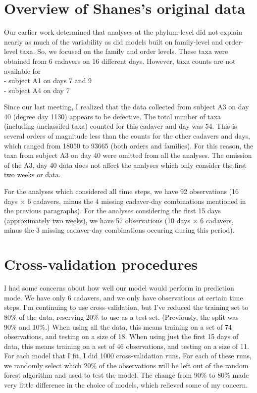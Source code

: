\documentclass{article}
\begin{document}
\section{Overview of Shanes's original data}

Our earlier work determined that analyses at the phylum-level did not
explain nearly as much of the variability as did models built on
family-level and order-level taxa.  So, we focused on the family and
order levels.  These taxa were obtained from 6 cadavers on 16 different
days.  However, taxa counts are not available for\\
- subject A1 on days 7 and 9\\
- subject A4 on day 7


Since our last meeting, I realized that the data collected from
subject A3 on day 40 (degree day 1130) appears to be defective.  The
total number of taxa (including unclassifed taxa) counted for this
cadaver and day was 54.  This is several orders of magnitude less than
the counts for the other cadavers and days, which ranged from 18050 to
93665 (both orders and families).  For this reason, the taxa from
subject A3 on day 40 were omitted from all the analyses.  The omission
of the A3, day 40 data does not affect the analyses which only
consider the first two weeks or data.

For the analyses which considered all time steps, we have 92
observations (16 days $\times$ 6 cadavers, minus the 4 missing
cadaver-day combinations mentioned in the previous paragraphs).  For
the analyses considering the first 15 days (approximately two weeks),
we have 57 observations (10 days $\times$ 6 cadavers, minus the 3
missing cadaver-day combinations occuring during this period).


\section{Cross-validation procedures}

I had some concerns about how well our model would perform in
prediction mode.  We have only 6 cadavers, and we only have
observations at certain time steps.  I'm continuing to use
cross-validation, but I've reduced the training set to 80\% of the
data, reserving 20\% to use as a test set.  (Previously, the split was
90\% and 10\%.)  When using all the data, this means training on a set
of 74 observations, and testing on a size of 18.  When using just the
first 15 days of data, this means training on a set of 46
observations, and testing on a size of 11.  For each model that I fit,
I did 1000 cross-validation runs.  For each of these runs, we randomly
select which 20\% of the observations will be left out of the random
forest algorithm and used to test the model.  The change from 90\% to
80\% made very little difference in the choice of models, which
relieved some of my concern.
\end{document}

